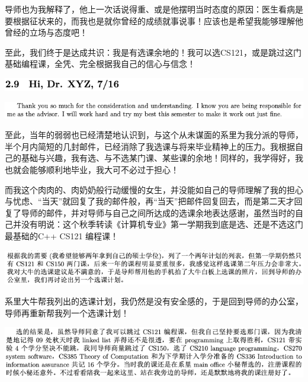 \documentclass[9pt, b5paper]{article}
\begin{document}
导师也为我解释了，他上一次话说得重、或是他摆明当时态度的原因：医生看病是要根据征状来的，而我也是就你曾经的成绩就事说事！应该也是希望我能够理解他曾经的立场与态度吧！

至此，我们终于是达成共识：我是有选课余地的！我可以选CS121，或是跳过这门基础编程课，全凭、完全根据我自己的信心与信念！

\begin{center}
\includegraphics[width=.9\linewidth]{./pic/backups_plans_20210421_094226.png}
\end{center}

\begin{center}
\includegraphics[width=.9\linewidth]{./pic/backups_plans_20210419_085907.png}
\end{center}

至此，当年的弱弱也已经清楚地认识到，与这个从未谋面的系里为我分派的导师，半个月内简短的几封邮件，已经消除了我选课与将来毕业精神上的压力。我根据自己的基础与兴趣，我有选、与不选某门课、某些课的余地！同样的，我学得好，我也就会能够顺利地毕业，我大可不必过于担心！

而我这个肉肉的、肉奶奶般行动缓慢的女生，并没能如自己的导师理解了我的担心与忧虑、“当天”就回复了我的邮件般，再“当天”把邮件回复回去，而是第二天才回复了导师的邮件，并对导师与自己之间所达成的选课余地表达感谢，虽然当时的自己并没有明说：这个秋季转读《计算机专业》第一学期我到底是选、还是不选这门最基础的C++ CS121 编程课！

\begin{center}
\includegraphics[width=.9\linewidth]{./pic/backups_plans_20210419_085958.png}
\end{center}

系里大牛帮我列出的选课计划，我仍然是没有安全感的，于是回到导师的办公室，导师再重新帮我列一个选课计划！

\begin{center}
\includegraphics[width=.9\linewidth]{./pic/backups_plans_20210421_141850.png}
\end{center}
\end{document}
